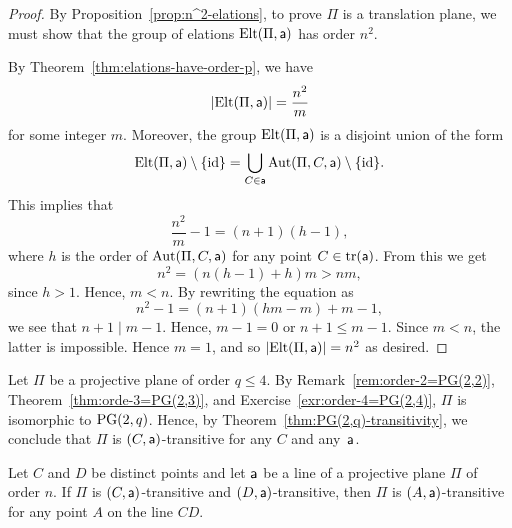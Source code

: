 \begin{proof}
    By Proposition~\ref{prop:n^2-elations}, to prove $\Pi$ is a translation plane, we must show that the group of elations $\mathrm{Elt}(\Pi,\mathsf a)$ has order $n^2$.

    By Theorem~\ref{thm:elations-have-order-p}, we have
    \[
    |\mathrm{Elt}(\Pi,\mathsf a)| = \frac{n^2}m
    \]
    for some integer $m$. Moreover, the group $\mathrm{Elt}(\Pi,\mathsf a)$ is a disjoint union of the form
    \[
    \mathrm{Elt}(\Pi,\mathsf a) \setminus\{\operatorname{id}\} = \bigcup_{C\in\mathsf a}\operatorname{Aut}(\Pi,C,\mathsf a) \setminus\{\operatorname{id}\}.
    \]
    This implies that
    \[
    \frac{n^2}m-1 = (n+1)(h-1),
    \]
    where $h$ is the order of $\operatorname{Aut}(\Pi,C,\mathsf a)$ for any point $C\in\operatorname{tr}(\mathsf a)$. From this we get
    \[
        n^2=(n(h-1)+h)m > nm,
    \]
    since $h>1$. Hence, $m<n$. By rewriting the equation as
    \[
    n^2-1 = (n+1)(hm-m)+m-1,
    \]
    we see that $n+1\mid m-1$. Hence, $m-1=0$ or $n+1\le m-1$. Since $m<n$, the latter is impossible. Hence $m=1$, and so $|\mathrm{Elt}(\Pi,\mathsf a)|=n^2$ as desired.
\end{proof}

\begin{rem}\label{rem:q-le-4}
    Let $\Pi$ be a projective plane of order $q \le 4$. By Remark~\ref{rem:order-2=PG(2,2)}, Theorem~\ref{thm:orde-3=PG(2,3)}, and Exercise~\ref{exr:order-4=PG(2,4)}, $\Pi$ is isomorphic to $\operatorname{PG}(2,q)$. Hence, by Theorem~\ref{thm:PG(2,q)-transitivity}, we conclude that $\Pi$ is $(C,\mathsf{a})$-transitive for any $C$ and any~$\mathsf{a}$.
\end{rem}

\begin{thm}\label{thm:transitivity}
    Let\/ $C$ and\/ $D$ be distinct points and let\/ $\mathsf{a}$ be a line of a projective plane\/ $\Pi$ of order\/ $n$. If\/ $\Pi$ is\/ $(C, \mathsf{a})$-transitive and\/ $(D, \mathsf{a})$-transitive, then\/ $\Pi$ is\/ $(A, \mathsf{a})$-transitive for any point\/ $A$ on the line\/ $CD$.
\end{thm}


